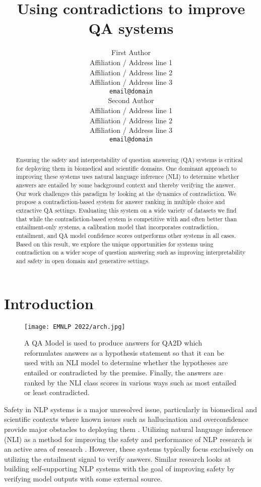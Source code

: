 \documentclass[11pt]{article}
\title{Using contradictions to improve QA systems}
\author{First Author \\
  Affiliation / Address line 1 \\
  Affiliation / Address line 2 \\
  Affiliation / Address line 3 \\
  \texttt{email@domain} \\\And
  Second Author \\
  Affiliation / Address line 1 \\
  Affiliation / Address line 2 \\
  Affiliation / Address line 3 \\
  \texttt{email@domain} \\}
\begin{document}
\maketitle
\begin{abstract}
Ensuring the safety and interpretability of question answering (QA) systems is critical for deploying them in biomedical and scientific domains. One dominant approach to improving these systems uses natural language inference (NLI) to determine whether answers are entailed by some background context and thereby verifying the answer. Our work challenges this paradigm by looking at the dynamics of contradiction. We propose a contradiction-based system for answer ranking in multiple choice and extractive QA settings. Evaluating this system on a wide variety of datasets we find that while the contradiction-based system is competitive with and often better than entailment-only systems, a calibration model that incorporates contradiction, entailment, and QA model confidence scores outperforms other systems in all cases. Based on this result, we explore the unique opportunities for systems using contradiction on a wider scope of question answering such as improving interpretability and safety in open domain and generative settings.
\end{abstract}

\section{Introduction}
\begin{figure}
    \centering
  \texttt{[image: EMNLP 2022/arch.jpg]}
  \caption{A QA Model is used to produce answers for QA2D which reformulates answers as a hypothesis statement so that it can be used with an NLI model to determine whether the hypotheses are entailed or contradicted by the premise. Finally, the answers are ranked by the NLI class scores in various ways such as most entailed or least contradicted.}
  \label{fig:architecture}
\end{figure}
Safety in NLP systems is a major unresolved issue, particularly in biomedical and scientific contexts where known issues such as hallucination and overconfidence provide major obstacles to deploying them \citep{ji_survey_2022,kell_what_2021}. Utilizing natural language inference (NLI) as a method for improving the safety and performance of NLP research is an active area of research \citep{li_faithfulness_2022}. However, these systems typically focus exclusively on utilizing the entailment signal to verify answers. Similar research looks at building self-supporting NLP systems \citep{nakano_webgpt_2022, menick_teaching_2022} with the goal of improving safety by verifying model outputs with some external source.
\end{document}
